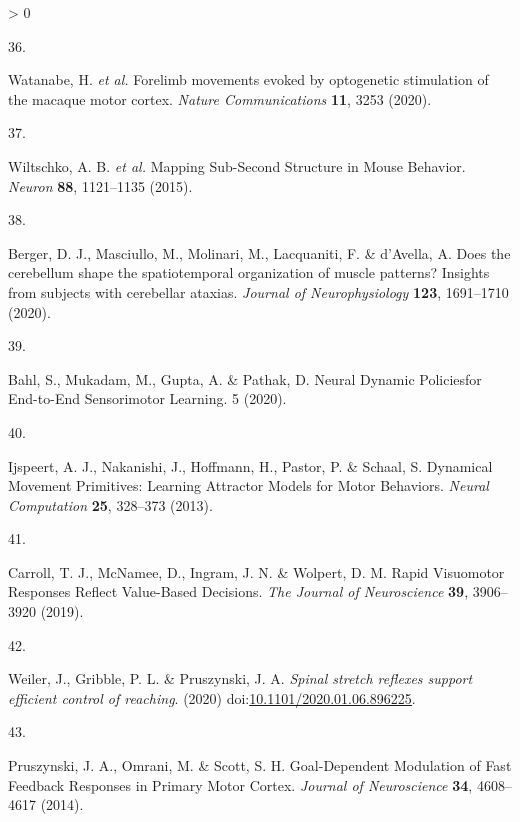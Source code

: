 \documentclass[
  a4paper,
]{article}
\newlength{\cslhangindent}
\newlength{\csllabelwidth}
\newenvironment{CSLReferences}[2] %
 {%
  \setlength{\parindent}{0pt}
  \ifodd #1 \everypar{\setlength{\hangindent}{\cslhangindent}}\ignorespaces\fi
  \ifnum #2 > 0
  \setlength{\parskip}{#2\baselineskip}
  \fi
 }%
 {}
\newcommand{\CSLLeftMargin}[1]{\parbox[t]{\csllabelwidth}{#1}}
\newcommand{\CSLRightInline}[1]{\parbox[t]{\linewidth - \csllabelwidth}{#1}\break}
\begin{document}
\begin{CSLReferences}{0}{0}
\leavevmode\hypertarget{ref-watanabeForelimbMovementsEvoked2020}{}%
\CSLLeftMargin{36. }
\CSLRightInline{Watanabe, H. \emph{et al.} Forelimb movements evoked by
optogenetic stimulation of the macaque motor cortex. \emph{Nature
Communications} \textbf{11}, 3253 (2020).}

\leavevmode\hypertarget{ref-wiltschkoMappingSubSecondStructure2015}{}%
\CSLLeftMargin{37. }
\CSLRightInline{Wiltschko, A. B. \emph{et al.} Mapping {Sub}-{Second
Structure} in {Mouse Behavior}. \emph{Neuron} \textbf{88}, 1121--1135
(2015).}

\leavevmode\hypertarget{ref-bergerDoesCerebellumShape2020}{}%
\CSLLeftMargin{38. }
\CSLRightInline{Berger, D. J., Masciullo, M., Molinari, M., Lacquaniti,
F. \& d'Avella, A. Does the cerebellum shape the spatiotemporal
organization of muscle patterns? {Insights} from subjects with
cerebellar ataxias. \emph{Journal of Neurophysiology} \textbf{123},
1691--1710 (2020).}

\leavevmode\hypertarget{ref-bahlNeuralDynamicPoliciesfor2020}{}%
\CSLLeftMargin{39. }
\CSLRightInline{Bahl, S., Mukadam, M., Gupta, A. \& Pathak, D. Neural
{Dynamic Policiesfor End}-to-{End Sensorimotor Learning}. 5 (2020).}

\leavevmode\hypertarget{ref-ijspeertDynamicalMovementPrimitives2013}{}%
\CSLLeftMargin{40. }
\CSLRightInline{Ijspeert, A. J., Nakanishi, J., Hoffmann, H., Pastor, P.
\& Schaal, S. Dynamical {Movement Primitives}: {Learning Attractor
Models} for {Motor Behaviors}. \emph{Neural Computation} \textbf{25},
328--373 (2013).}

\leavevmode\hypertarget{ref-carrollRapidVisuomotorResponses2019}{}%
\CSLLeftMargin{41. }
\CSLRightInline{Carroll, T. J., McNamee, D., Ingram, J. N. \& Wolpert,
D. M. Rapid {Visuomotor Responses Reflect Value}-{Based Decisions}.
\emph{The Journal of Neuroscience} \textbf{39}, 3906--3920 (2019).}

\leavevmode\hypertarget{ref-weiler2020}{}%
\CSLLeftMargin{42. }
\CSLRightInline{Weiler, J., Gribble, P. L. \& Pruszynski, J. A.
\emph{Spinal stretch reflexes support efficient control of reaching}.
(2020)
doi:\href{https://doi.org/10.1101/2020.01.06.896225}{10.1101/2020.01.06.896225}.}

\leavevmode\hypertarget{ref-pruszynski2014}{}%
\CSLLeftMargin{43. }
\CSLRightInline{Pruszynski, J. A., Omrani, M. \& Scott, S. H.
Goal-{Dependent Modulation} of {Fast Feedback Responses} in {Primary
Motor Cortex}. \emph{Journal of Neuroscience} \textbf{34}, 4608--4617
(2014).}


\end{CSLReferences}
\end{document}
